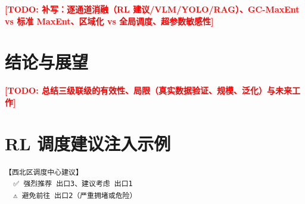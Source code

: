 \documentclass[UTF8,zihao=-4]{ctexart}
\newcommand{\todo}[1]{\textcolor{red}{\textbf{[TODO: #1]}}}
\begin{document}
\todo{补写：逐通道消融（RL 建议/VLM/YOLO/RAG）、GC-MaxEnt vs 标准 MaxEnt、区域化 vs 全局调度、超参数敏感性}

\section{结论与展望}

\todo{总结三级联级的有效性、局限（真实数据验证、规模、泛化）与未来工作}

\appendix
\section{RL 调度建议注入示例}

\begin{verbatim}
【西北区调度中心建议】
  ✅ 强烈推荐 出口3、建议考虑 出口1
  ⚠️ 避免前往 出口2（严重拥堵或危险）
\end{verbatim}

\printbibliography[heading=bibintoc]
\end{document}
